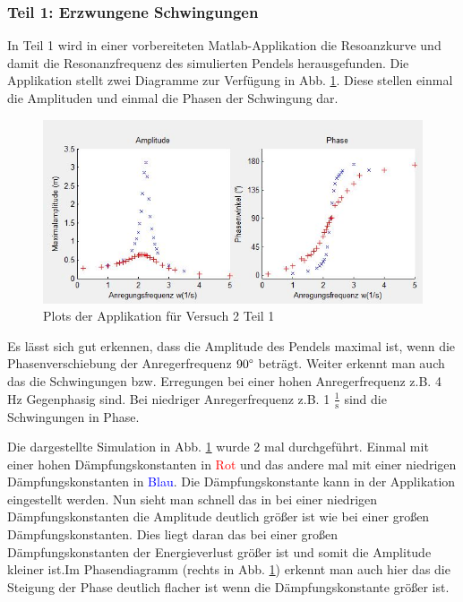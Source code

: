         \subsubsection{Teil 1: Erzwungene Schwingungen}
            
            In Teil 1 wird in einer vorbereiteten Matlab-Applikation die Resoanzkurve und damit die Resonanzfrequenz des simulierten Pendels herausgefunden. Die Applikation stellt zwei Diagramme zur Verfügung in Abb. \ref{fig:plots_v2}. Diese stellen einmal die Amplituden und einmal die Phasen der Schwingung dar.
            
            \begin{figure}[H]
                \centering
                \includegraphics[width=\textwidth]{bilder/plots_v2.jpg}
                \caption{Plots der Applikation für Versuch 2 Teil 1}
                \label{fig:plots_v2}
            \end{figure}

            Es lässt sich gut erkennen, dass die Amplitude des Pendels maximal ist, wenn die Phasenverschiebung der Anregerfrequenz $90\text{\textdegree}$ beträgt.
            Weiter erkennt man auch das die Schwingungen bzw. Erregungen bei einer hohen Anregerfrequenz z.B. 4 Hz Gegenphasig sind. Bei niedriger Anregerfrequenz z.B. 1 $\frac{1}{\mathrm{s}}$ sind die Schwingungen in Phase.
            
            Die dargestellte Simulation in Abb. \ref{fig:plots_v2} wurde 2 mal durchgeführt. Einmal mit einer hohen Dämpfungskonstanten in \textcolor{red}{Rot} und das andere mal mit einer niedrigen Dämpfungskonstanten in \textcolor{blue}{Blau}. Die Dämpfungskonstante kann in der Applikation eingestellt werden. Nun sieht man schnell das in bei einer niedrigen Dämpfungskonstanten die Amplitude deutlich größer ist wie bei einer großen Dämpfungskonstanten. Dies liegt daran das bei einer großen Dämpfungskonstanten der Energieverlust größer ist und somit die Amplitude kleiner ist.Im Phasendiagramm (rechts in Abb. \ref{fig:plots_v2}) erkennt man auch hier das die Steigung der Phase deutlich flacher ist wenn die Dämpfungskonstante größer ist. 

